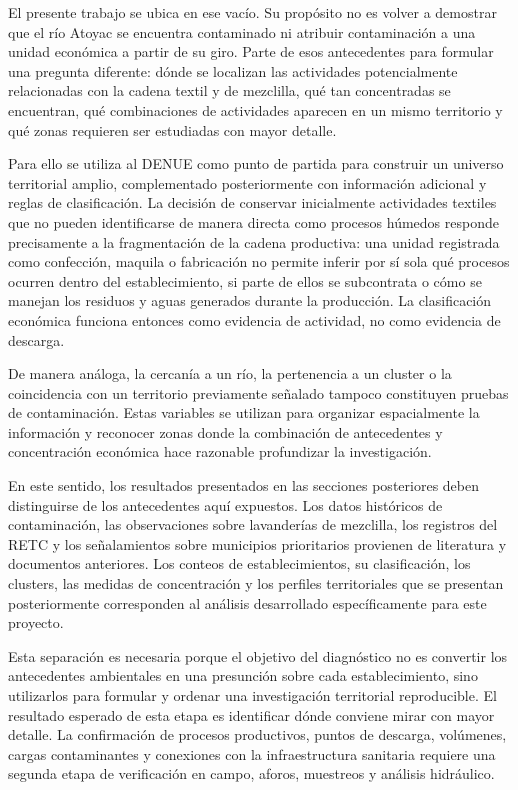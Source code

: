 \documentclass[11pt,letterpaper]{article}
\begin{document}
El presente trabajo se ubica en ese vacío. Su propósito no es volver a demostrar que el río Atoyac se encuentra contaminado ni atribuir contaminación a una unidad económica a partir de su giro. Parte de esos antecedentes para formular una pregunta diferente: dónde se localizan las actividades potencialmente relacionadas con la cadena textil y de mezclilla, qué tan concentradas se encuentran, qué combinaciones de actividades aparecen en un mismo territorio y qué zonas requieren ser estudiadas con mayor detalle.

Para ello se utiliza al DENUE como punto de partida para construir un universo territorial amplio, complementado posteriormente con información adicional y reglas de clasificación. La decisión de conservar inicialmente actividades textiles que no pueden identificarse de manera directa como procesos húmedos responde precisamente a la fragmentación de la cadena productiva: una unidad registrada como confección, maquila o fabricación no permite inferir por sí sola qué procesos ocurren dentro del establecimiento, si parte de ellos se subcontrata o cómo se manejan los residuos y aguas generados durante la producción. La clasificación económica funciona entonces como evidencia de actividad, no como evidencia de descarga.

De manera análoga, la cercanía a un río, la pertenencia a un cluster o la coincidencia con un territorio previamente señalado tampoco constituyen pruebas de contaminación. Estas variables se utilizan para organizar espacialmente la información y reconocer zonas donde la combinación de antecedentes y concentración económica hace razonable profundizar la investigación.

En este sentido, los resultados presentados en las secciones posteriores deben distinguirse de los antecedentes aquí expuestos. Los datos históricos de contaminación, las observaciones sobre lavanderías de mezclilla, los registros del RETC y los señalamientos sobre municipios prioritarios provienen de literatura y documentos anteriores. Los conteos de establecimientos, su clasificación, los clusters, las medidas de concentración y los perfiles territoriales que se presentan posteriormente corresponden al análisis desarrollado específicamente para este proyecto.

Esta separación es necesaria porque el objetivo del diagnóstico no es convertir los antecedentes ambientales en una presunción sobre cada establecimiento, sino utilizarlos para formular y ordenar una investigación territorial reproducible. El resultado esperado de esta etapa es identificar dónde conviene mirar con mayor detalle. La confirmación de procesos productivos, puntos de descarga, volúmenes, cargas contaminantes y conexiones con la infraestructura sanitaria requiere una segunda etapa de verificación en campo, aforos, muestreos y análisis hidráulico.
\end{document}
